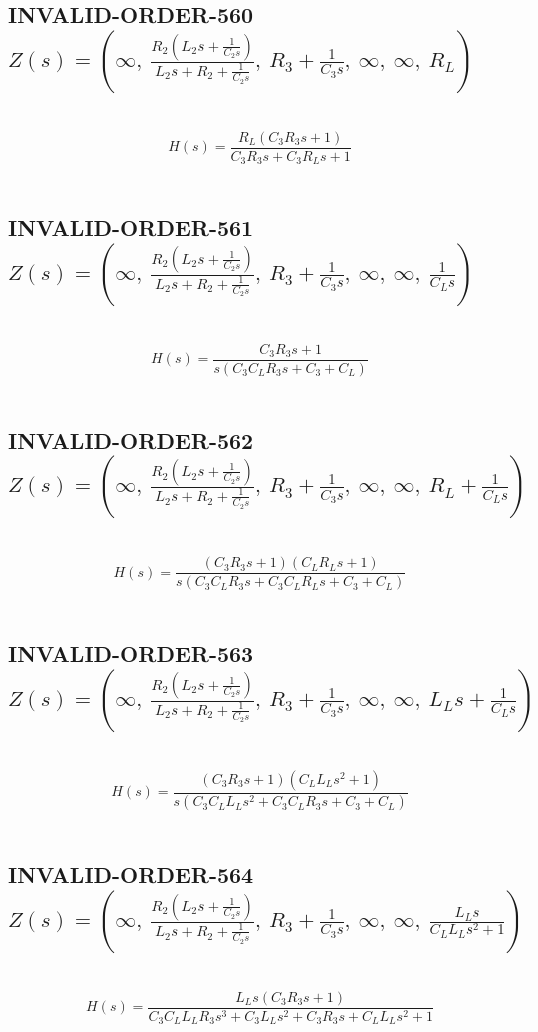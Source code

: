 \documentclass{article}
\begin{document}
\subsection{INVALID-ORDER-560 $Z(s) = \left( \infty, \  \frac{R_{2} \left(L_{2} s + \frac{1}{C_{2} s}\right)}{L_{2} s + R_{2} + \frac{1}{C_{2} s}}, \  R_{3} + \frac{1}{C_{3} s}, \  \infty, \  \infty, \  R_{L}\right)$ } \ 
\textbf{\[H(s) = \frac{R_{L} \left(C_{3} R_{3} s + 1\right)}{C_{3} R_{3} s + C_{3} R_{L} s + 1}\] } \ 
\subsection{INVALID-ORDER-561 $Z(s) = \left( \infty, \  \frac{R_{2} \left(L_{2} s + \frac{1}{C_{2} s}\right)}{L_{2} s + R_{2} + \frac{1}{C_{2} s}}, \  R_{3} + \frac{1}{C_{3} s}, \  \infty, \  \infty, \  \frac{1}{C_{L} s}\right)$ } \ 
\textbf{\[H(s) = \frac{C_{3} R_{3} s + 1}{s \left(C_{3} C_{L} R_{3} s + C_{3} + C_{L}\right)}\] } \ 
\subsection{INVALID-ORDER-562 $Z(s) = \left( \infty, \  \frac{R_{2} \left(L_{2} s + \frac{1}{C_{2} s}\right)}{L_{2} s + R_{2} + \frac{1}{C_{2} s}}, \  R_{3} + \frac{1}{C_{3} s}, \  \infty, \  \infty, \  R_{L} + \frac{1}{C_{L} s}\right)$ } \ 
\textbf{\[H(s) = \frac{\left(C_{3} R_{3} s + 1\right) \left(C_{L} R_{L} s + 1\right)}{s \left(C_{3} C_{L} R_{3} s + C_{3} C_{L} R_{L} s + C_{3} + C_{L}\right)}\] } \ 
\subsection{INVALID-ORDER-563 $Z(s) = \left( \infty, \  \frac{R_{2} \left(L_{2} s + \frac{1}{C_{2} s}\right)}{L_{2} s + R_{2} + \frac{1}{C_{2} s}}, \  R_{3} + \frac{1}{C_{3} s}, \  \infty, \  \infty, \  L_{L} s + \frac{1}{C_{L} s}\right)$ } \ 
\textbf{\[H(s) = \frac{\left(C_{3} R_{3} s + 1\right) \left(C_{L} L_{L} s^{2} + 1\right)}{s \left(C_{3} C_{L} L_{L} s^{2} + C_{3} C_{L} R_{3} s + C_{3} + C_{L}\right)}\] } \ 
\subsection{INVALID-ORDER-564 $Z(s) = \left( \infty, \  \frac{R_{2} \left(L_{2} s + \frac{1}{C_{2} s}\right)}{L_{2} s + R_{2} + \frac{1}{C_{2} s}}, \  R_{3} + \frac{1}{C_{3} s}, \  \infty, \  \infty, \  \frac{L_{L} s}{C_{L} L_{L} s^{2} + 1}\right)$ } \ 
\textbf{\[H(s) = \frac{L_{L} s \left(C_{3} R_{3} s + 1\right)}{C_{3} C_{L} L_{L} R_{3} s^{3} + C_{3} L_{L} s^{2} + C_{3} R_{3} s + C_{L} L_{L} s^{2} + 1}\] } \ 
\end{document}

